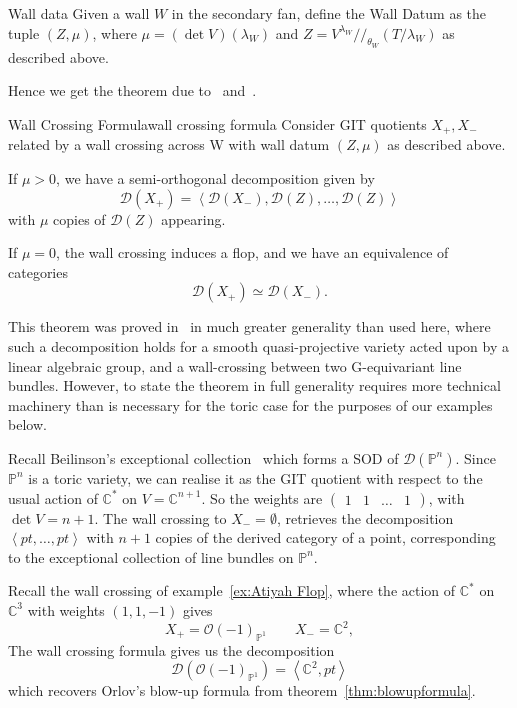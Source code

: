 \begin{definition}{Wall data}{}
	Given a wall $W$ in the secondary fan, define the Wall Datum as the tuple $(Z, \mu)$, where $\mu = (\det V)(\lambda_W)$ and $Z = V^{\lambda_{W}} / /_{\theta_{W}} \left( T/ \lambda_{W}\right)$ as described above. 
\end{definition}

Hence we get the theorem due to~\cite*{halpernleistner2014derived} and~\cite*{ballard2014variation}.

\begin{theorem}{Wall Crossing Formula}{wall crossing formula}
Consider GIT quotients $X_{+},X_{-}$  related by a wall crossing across W  with wall datum $(Z, \mu)$ as described above. 

If $\mu > 0$, we have a semi-orthogonal decomposition given by $$\mathcal{D}(X_{+}) = \left< \mathcal{D}(X_{-}),\mathcal{D}(Z) , \dots, \mathcal{D}(Z)  \right>$$ with $\mu$ copies of $\mathcal{D}(Z)$ appearing.

If $\mu = 0$, the wall crossing induces a flop, and we have an equivalence of categories $$\mathcal{D}(X_{+})\simeq \mathcal{D}(X_-).$$
\end{theorem}

This theorem was proved in~\cite*{ballard2014variation} in much greater generality than used here, where such a decomposition holds for a smooth quasi-projective variety acted upon by a linear algebraic group, and a wall-crossing between two G-equivariant line bundles. However, to state the theorem in full generality requires more technical machinery than is necessary for the toric case for the purposes of our examples below. 

\begin{example}{}{}
    Recall Beilinson's exceptional collection~\cite*{Beilinson1978} which forms a SOD of $\mathcal{D}(\mathbb{P}^n)$. Since $\mathbb{P}^n$ is a toric variety, we can realise it as the GIT quotient with respect to the usual action of $\mathbb{C}^*$ on $V = \mathbb{C}^{n+1}$. So the weights are $\begin{pmatrix}1 & 1 &\dots &1\end{pmatrix}$, with $\det V = n+1$. The wall crossing to $X_{-}=\emptyset$, retrieves the decomposition $\left< pt, \dots,pt \right>$ with $n+1$ copies of the derived category of a point, corresponding to the exceptional collection of line bundles on $\mathbb{P}^n$. 
\end{example}

\begin{example}{}{}
	Recall the wall crossing of example~\ref*{ex:Atiyah Flop}, where the action of $\mathbb{C}^{*}$ on $\mathbb{C}^3$ with weights $(1,1,-1)$ gives $$X_{+}= \mathcal{O}(-1)_{\mathbb{P}^{1}} \qquad X_{-}= \mathbb{C}^2, $$ The wall crossing formula gives us the decomposition $$\mathcal{D}(\mathcal{O}(-1)_{\mathbb{P}^{1}})= \left< \mathbb{C}^{2}, pt \right> $$ which recovers Orlov's blow-up formula from theorem~\ref*{thm:blowupformula}.
\end{example}

